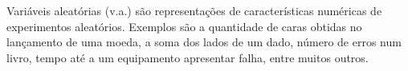 Variáveis aleatórias (v.a.) são representações de características numéricas de
experimentos aleatórios.
Exemplos são a quantidade de caras obtidas no lançamento de uma moeda, a soma dos lados de
um dado, número de erros num livro, tempo até a um equipamento apresentar falha, entre
muitos outros.

